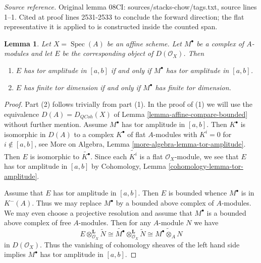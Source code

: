 \documentclass{stacks-project}
\theoremstyle{plain}
\newtheorem{lemma}[subsection]{Lemma}
\theoremstyle{definition}
\theoremstyle{remark}
\numberwithin{equation}{subsection}
\def\Spec{\mathop{\mathrm{Spec}}}
\def\QCoh{\mathit{QCoh}}
\begin{document}
\noindent\textit{Source reference.} Original lemma 08CI: sources/stacks-chow/tags.txt, source lines 1--1. Cited at proof lines 2531-2533 to conclude the forward direction; the flat representative it is applied to is constructed inside the counted span.\par\medskip
\begin{lemma}
\label{lemma-tor-dimension-affine}
Let $X = \Spec(A)$ be an affine scheme. Let $M^\bullet$ be a
complex of $A$-modules and let $E$ be the corresponding object
of $D(\mathcal{O}_X)$. Then
\begin{enumerate}
\item $E$ has tor amplitude in $[a, b]$ if and only if $M^\bullet$
has tor amplitude in $[a, b]$.
\item $E$ has finite tor dimension if and only if $M^\bullet$
has finite tor dimension.
\end{enumerate}
\end{lemma}

\begin{proof}
Part (2) follows trivially from part (1). In the proof of (1) we will
use the equivalence $D(A) = D_\QCoh(X)$ of
Lemma \ref{lemma-affine-compare-bounded}
without further mention.
Assume $M^\bullet$ has tor amplitude in $[a, b]$. Then $K^\bullet$
is isomorphic in $D(A)$ to a complex $K^\bullet$ of flat $A$-modules
with $K^i = 0$ for $i \not \in [a, b]$, see
More on Algebra, Lemma \ref{more-algebra-lemma-tor-amplitude}.
Then $E$ is isomorphic to $\widetilde{K^\bullet}$. Since each
$\widetilde{K^i}$ is a flat $\mathcal{O}_X$-module, we see
that $E$ has tor amplitude in $[a, b]$ by
Cohomology, Lemma \ref{cohomology-lemma-tor-amplitude}.

\medskip\noindent
Assume that $E$ has tor amplitude in $[a, b]$. Then $E$ is bounded
whence $M^\bullet$ is in $K^-(A)$. Thus we may replace $M^\bullet$
by a bounded above complex of $A$-modules. We may even choose
a projective resolution and assume that $M^\bullet$ is a bounded above
complex of free $A$-modules. Then for any $A$-module $N$ we have
$$
E \otimes_{\mathcal{O}_X}^\mathbf{L} \widetilde{N}
\cong
\widetilde{M^\bullet} \otimes_{\mathcal{O}_X}^\mathbf{L} \widetilde{N}
\cong
\widetilde{M^\bullet \otimes_A N}
$$
in $D(\mathcal{O}_X)$. Thus the vanishing of cohomology sheaves of
the left hand side implies $M^\bullet$ has tor amplitude in $[a, b]$.
\end{proof}
\end{document}
